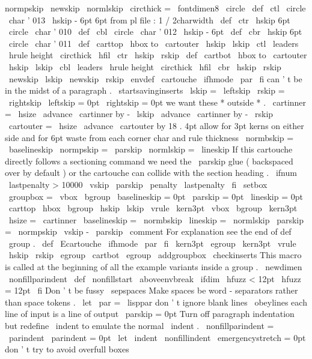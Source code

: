 {{{normpskip
\
newskip
\
normlskip
\
circthick
=
\
fontdimen8
\
circle
%
\
def
\
ctl
{
{
\
circle
\
char
'
013
\
hskip
-
6pt
}
}
%
6pt
from
pl
file
:
1
/
2charwidth
\
def
\
ctr
{
{
\
hskip
6pt
\
circle
\
char
'
010
}
}
\
def
\
cbl
{
{
\
circle
\
char
'
012
\
hskip
-
6pt
}
}
\
def
\
cbr
{
{
\
hskip
6pt
\
circle
\
char
'
011
}
}
\
def
\
carttop
{
\
hbox
to
\
cartouter
{
\
hskip
\
lskip
\
ctl
\
leaders
\
hrule
height
\
circthick
\
hfil
\
ctr
\
hskip
\
rskip
}
}
\
def
\
cartbot
{
\
hbox
to
\
cartouter
{
\
hskip
\
lskip
\
cbl
\
leaders
\
hrule
height
\
circthick
\
hfil
\
cbr
\
hskip
\
rskip
}
}
%
\
newskip
\
lskip
\
newskip
\
rskip
\
envdef
\
cartouche
{
%
\
ifhmode
\
par
\
fi
%
can
'
t
be
in
the
midst
of
a
paragraph
.
\
startsavinginserts
\
lskip
=
\
leftskip
\
rskip
=
\
rightskip
\
leftskip
=
0pt
\
rightskip
=
0pt
%
we
want
these
*
outside
*
.
\
cartinner
=
\
hsize
\
advance
\
cartinner
by
-
\
lskip
\
advance
\
cartinner
by
-
\
rskip
\
cartouter
=
\
hsize
\
advance
\
cartouter
by
18
.
4pt
%
allow
for
3pt
kerns
on
either
%
side
and
for
6pt
waste
from
%
each
corner
char
and
rule
thickness
\
normbskip
=
\
baselineskip
\
normpskip
=
\
parskip
\
normlskip
=
\
lineskip
%
%
If
this
cartouche
directly
follows
a
sectioning
command
we
need
the
%
\
parskip
glue
(
backspaced
over
by
default
)
or
the
cartouche
can
%
collide
with
the
section
heading
.
\
ifnum
\
lastpenalty
>
10000
\
vskip
\
parskip
\
penalty
\
lastpenalty
\
fi
%
\
setbox
\
groupbox
=
\
vbox
\
bgroup
\
baselineskip
=
0pt
\
parskip
=
0pt
\
lineskip
=
0pt
\
carttop
\
hbox
\
bgroup
\
hskip
\
lskip
\
vrule
\
kern3pt
\
vbox
\
bgroup
\
kern3pt
\
hsize
=
\
cartinner
\
baselineskip
=
\
normbskip
\
lineskip
=
\
normlskip
\
parskip
=
\
normpskip
\
vskip
-
\
parskip
\
comment
%
For
explanation
see
the
end
of
def
\
group
.
}
\
def
\
Ecartouche
{
%
\
ifhmode
\
par
\
fi
\
kern3pt
\
egroup
\
kern3pt
\
vrule
\
hskip
\
rskip
\
egroup
\
cartbot
\
egroup
\
addgroupbox
\
checkinserts
}
%
This
macro
is
called
at
the
beginning
of
all
the
example
variants
%
inside
a
group
.
\
newdimen
\
nonfillparindent
\
def
\
nonfillstart
{
%
\
aboveenvbreak
\
ifdim
\
hfuzz
<
12pt
\
hfuzz
=
12pt
\
fi
%
Don
'
t
be
fussy
\
sepspaces
%
Make
spaces
be
word
-
separators
rather
than
space
tokens
.
\
let
\
par
=
\
lisppar
%
don
'
t
ignore
blank
lines
\
obeylines
%
each
line
of
input
is
a
line
of
output
\
parskip
=
0pt
%
Turn
off
paragraph
indentation
but
redefine
\
indent
to
emulate
%
the
normal
\
indent
.
\
nonfillparindent
=
\
parindent
\
parindent
=
0pt
\
let
\
indent
\
nonfillindent
%
\
emergencystretch
=
0pt
%
don
'
t
try
to
avoid
overfull
boxes
\
}}}}
